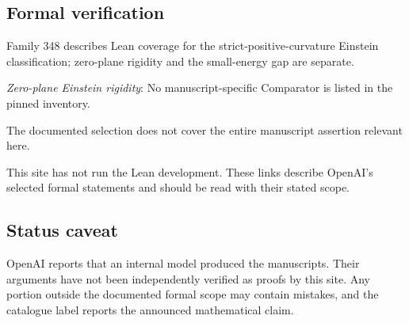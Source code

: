 \documentclass[11pt]{article}
\begin{document}
\subsection{Formal verification}
Family 348 describes Lean coverage for the strict-positive-curvature Einstein classification; zero-plane rigidity and the small-energy gap are separate.

\textit{Zero-plane Einstein rigidity}: No manuscript-specific Comparator is listed in the pinned inventory.

The documented selection does not cover the entire manuscript assertion relevant here.

This site has not run the Lean development. These links describe OpenAI’s selected formal statements and should be read with their stated scope.

\subsection{Status caveat}
OpenAI reports that an internal model produced the manuscripts. Their arguments have not been independently verified as proofs by this site. Any portion outside the documented formal scope may contain mistakes, and the catalogue label reports the announced mathematical claim.
\end{document}

